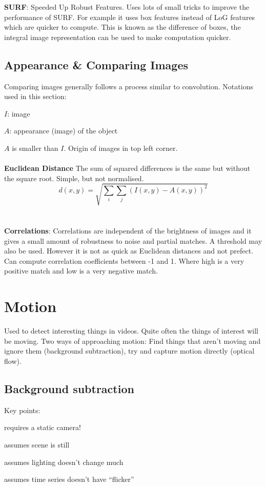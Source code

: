 \documentclass[8pt]{extarticle}
\begin{document}
\begin{multicols}{2}
\textbf{SURF}: Speeded Up Robust Features. Uses lots of small tricks to improve the performance of SURF. For example it uses box features instead of LoG features which are quicker to compute. This is known as the difference of boxes, the integral image representation can be used to make computation quicker.

\subsection{Appearance \& Comparing Images}
Comparing images generally follows a process similar to convolution. Notations used in this section:
\begin{compactitem}
    \item $I$: image
    \item $A$: appearance (image) of the object
\end{compactitem}
$A$ is smaller than $I$. Origin of images in top left corner.
\\ \\
\textbf{Euclidean Distance}
The sum of squared differences is the same but without the square root. Simple, but not normalised.
\begin{equation}
    d(x,y) = \sqrt{\sum\limits_{i}\sum\limits_{j} (I(x,y) - A(x,y))^2}
\end{equation}
\\ \\
\textbf{Correlations}:
Correlations are independent of the brightness of images and it gives a small amount of robustness to noise and partial matches. A threshold may also be used. However it is not as quick as Euclidean distances and not prefect. Can compute correlation coefficients between -1 and 1. Where high is a very positive match and low is a very negative match.

\section{Motion}
Used to detect interesting things in videos. Quite often the things of interest will be moving. Two ways of approaching motion: Find things that aren't moving and ignore them (background subtraction), try and capture motion directly (optical flow).

\subsection{Background subtraction}
Key points:
\begin{compactitem}
    \item requires a static camera!
    \item assumes scene is still
    \item assumes lighting doesn't change much
    \item assumes time series doesn't have ``flicker''
\end{compactitem}


\end{multicols}
\end{document}

